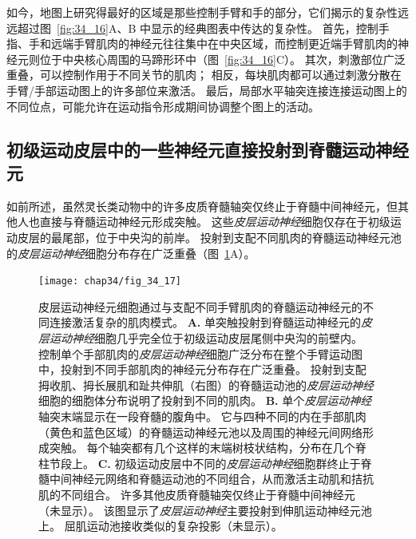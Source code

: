如今，地图上研究得最好的区域是那些控制手臂和手的部分，它们揭示的复杂性远远超过图~\ref{fig:34_16}A、B 中显示的经典图表中传达的复杂性。
首先，控制手指、手和远端手臂肌肉的神经元往往集中在中央区域，而控制更近端手臂肌肉的神经元则位于中央核心周围的马蹄形环中（图~\ref{fig:34_16}C）。
其次，刺激部位广泛重叠，可以控制作用于不同关节的肌肉；
相反，每块肌肉都可以通过刺激分散在手臂/手部运动图上的许多部位来激活。
最后，局部水平轴突连接连接运动图上的不同位点，可能允许在运动指令形成期间协调整个图上的活动。



\subsection{初级运动皮层中的一些神经元直接投射到脊髓运动神经元}

如前所述，虽然灵长类动物中的许多皮质脊髓轴突仅终止于脊髓中间神经元，但其他人也直接与脊髓运动神经元形成突触。
这些\textit{皮层运动神经}细胞仅存在于初级运动皮层的最尾部，位于中央沟的前岸。
投射到支配不同肌肉的脊髓运动神经元池的\textit{皮层运动神经}细胞分布存在广泛重叠（图~\ref{fig:34_17}A）。


\begin{figure}[htbp]
	\centering
	\texttt{[image: chap34/fig\_34\_17]}
	\caption{皮层运动神经元细胞通过与支配不同手臂肌肉的脊髓运动神经元的不同连接激活复杂的肌肉模式。
		\textbf{A.} 单突触投射到脊髓运动神经元的\textit{皮层运动神经}细胞几乎完全位于初级运动皮层尾侧中央沟的前壁内。
		控制单个手部肌肉的\textit{皮层运动神经}细胞广泛分布在整个手臂运动图中，投射到不同手部肌肉的神经元分布存在广泛重叠。
		投射到支配拇收肌、拇长展肌和趾共伸肌（右图）的脊髓运动池的\textit{皮层运动神经}细胞的细胞体分布说明了投射到不同的肌肉\cite{rathelot2006muscle}。
		\textbf{B.} 单个\textit{皮层运动神经}轴突末端显示在一段脊髓的腹角中。
		它与四种不同的内在手部肌肉（黄色和蓝色区域）的脊髓运动神经元池以及周围的神经元间网络形成突触。
		每个轴突都有几个这样的末端树枝状结构，分布在几个脊柱节段上\cite{shinoda1981divergent}。
		\textbf{C.} 初级运动皮层中不同的\textit{皮层运动神经}细胞群终止于脊髓中间神经元网络和脊髓运动池的不同组合，从而激活主动肌和拮抗肌的不同组合。
		许多其他皮质脊髓轴突仅终止于脊髓中间神经元（未显示）。
		该图显示了\textit{皮层运动神经}主要投射到伸肌运动神经元池上。
		屈肌运动池接收类似的复杂投影（未显示）\cite{cheney1985patterns}。}
	\label{fig:34_17}
\end{figure}


